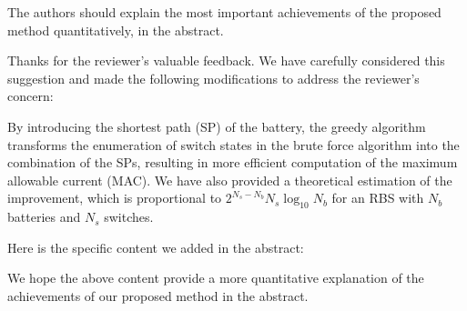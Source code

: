 \reviewer
\begin{revcomment}
  The authors should explain the most important achievements of the proposed method quantitatively, in the abstract.
\end{revcomment}
\begin{revresponse}

Thanks for the reviewer's valuable feedback. We have carefully considered this suggestion and made the following modifications to address the reviewer's concern:


By introducing the shortest path (SP) of the battery, the greedy algorithm transforms the enumeration of switch states in the brute force algorithm into the combination of the SPs, resulting in more efficient computation of the maximum allowable current (MAC).
We have also provided a theoretical estimation of the improvement, which is proportional to $2^{N_s - N_b} N_s \log_{10} N_b$ for an RBS with $N_b$ batteries and $N_s$ switches.


Here is the specific content we added in the abstract:
\begin{changes}
\end{changes}


We hope the above content provide a more quantitative explanation of the achievements of our proposed method in the abstract. 

\end{revresponse}

